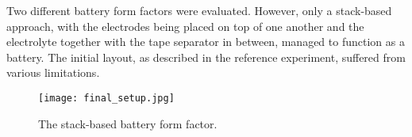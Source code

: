 Two different battery form factors were evaluated. However, only a stack-based approach, with the electrodes being placed on top of one another and the electrolyte together with the tape separator in between, managed to function as a battery. The initial layout, as described in the reference experiment, suffered from various limitations\cite{Klaus2022}.

\begin{figure}[ht!]
\centering
\texttt{[image: final\_setup.jpg]}
\caption{The stack-based battery form factor.}
\label{fig:finalsetup}
\end{figure}